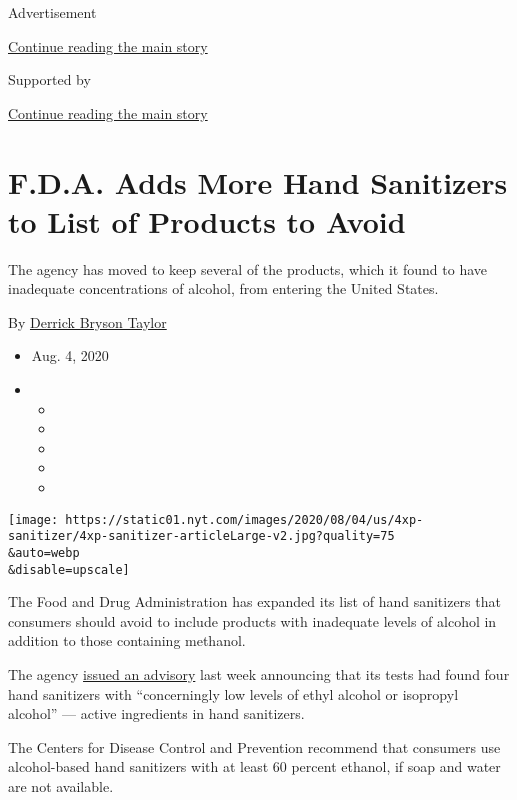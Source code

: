 Advertisement

\protect\hyperlink{after-top}{Continue reading the main story}

Supported by

\protect\hyperlink{after-sponsor}{Continue reading the main story}

\hypertarget{fda-adds-more-hand-sanitizers-to-list-of-products-to-avoid}{%
\section{F.D.A. Adds More Hand Sanitizers to List of Products to
Avoid}\label{fda-adds-more-hand-sanitizers-to-list-of-products-to-avoid}}

The agency has moved to keep several of the products, which it found to
have inadequate concentrations of alcohol, from entering the United
States.

By \href{https://www.nytimes.com/by/derrick-bryson-taylor}{Derrick
Bryson Taylor}

\begin{itemize}
\item
  Aug. 4, 2020
\item
  \begin{itemize}
  \item
  \item
  \item
  \item
  \item
  \end{itemize}
\end{itemize}

\texttt{[image: https://static01.nyt.com/images/2020/08/04/us/4xp-sanitizer/4xp-sanitizer-articleLarge-v2.jpg?quality=75\\\&auto=webp\\\&disable=upscale]}

The Food and Drug Administration has expanded its list of hand
sanitizers that consumers should avoid to include products with
inadequate levels of alcohol in addition to those containing methanol.

The agency
\href{https://www.fda.gov/drugs/drug-safety-and-availability/fda-updates-hand-sanitizers-consumers-should-not-use\#products}{issued
an advisory} last week announcing that its tests had found four hand
sanitizers with ``concerningly low levels of ethyl alcohol or isopropyl
alcohol'' --- active ingredients in hand sanitizers.

The Centers for Disease Control and Prevention recommend that consumers
use alcohol-based hand sanitizers with at least 60 percent ethanol, if
soap and water are not available.

